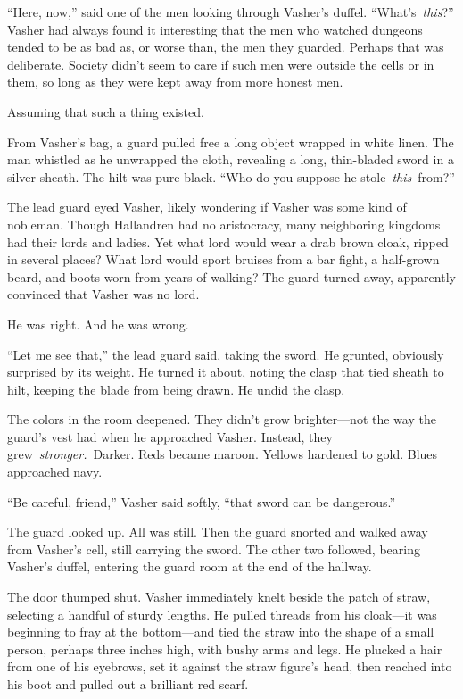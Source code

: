 “Here, now,” said one of the men looking through Vasher’s duffel. “What’s~\textit{this}?” Vasher had always found it interesting that the men who watched dungeons tended to be as bad as, or worse than, the men they guarded. Perhaps that was deliberate. Society didn’t seem to care if such men were outside the cells or in them, so long as they were kept away from more honest men.

Assuming that such a thing existed.

From Vasher’s bag, a guard pulled free a long object wrapped in white linen. The man whistled as he unwrapped the cloth, revealing a long, thin-bladed sword in a silver sheath. The hilt was pure black. “Who do you suppose he stole~\textit{this}~from?”

The lead guard eyed Vasher, likely wondering if Vasher was some kind of nobleman. Though Hallandren had no aristocracy, many neighboring kingdoms had their lords and ladies. Yet what lord would wear a drab brown cloak, ripped in several places? What lord would sport bruises from a bar fight, a half-grown beard, and boots worn from years of walking? The guard turned away, apparently convinced that Vasher was no lord.

He was right. And he was wrong.

“Let me see that,” the lead guard said, taking the sword. He grunted, obviously surprised by its weight. He turned it about, noting the clasp that tied sheath to hilt, keeping the blade from being drawn. He undid the clasp.

The colors in the room deepened. They didn’t grow brighter—not the way the guard’s vest had when he approached Vasher. Instead, they grew~\textit{stronger.}~Darker. Reds became maroon. Yellows hardened to gold. Blues approached navy.

“Be careful, friend,” Vasher said softly, “that sword can be dangerous.”

The guard looked up. All was still. Then the guard snorted and walked away from Vasher’s cell, still carrying the sword. The other two followed, bearing Vasher’s duffel, entering the guard room at the end of the hallway.

The door thumped shut. Vasher immediately knelt beside the patch of straw, selecting a handful of sturdy lengths. He pulled threads from his cloak—it was beginning to fray at the bottom—and tied the straw into the shape of a small person, perhaps three inches high, with bushy arms and legs. He plucked a hair from one of his eyebrows, set it against the straw figure’s head, then reached into his boot and pulled out a brilliant red scarf.

